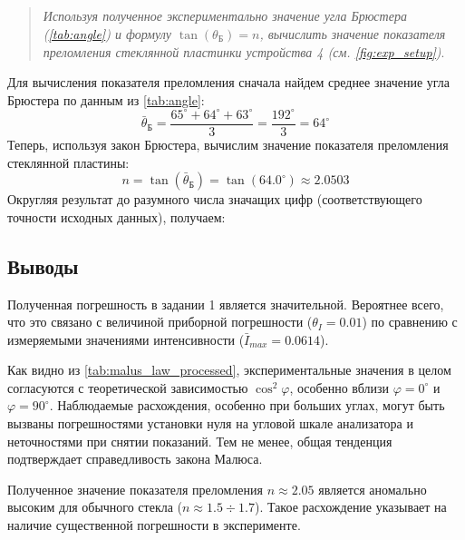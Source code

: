 \subsection*{  }
\begin{quote}
    \textit{Используя полученное экспериментально значение угла Брюстера (\cref{tab:angle}) и формулу $\tan(\theta_\text{Б}) = n$, вычислить значение показателя преломления стеклянной пластинки устройства 4 (см. \cref{fig:exp_setup})}.
\end{quote}

Для вычисления показателя преломления сначала найдем среднее значение угла Брюстера по данным из \cref{tab:angle}:
$$
\bar{\theta}_Б = \frac{65^\circ + 64^\circ + 63^\circ}{3} = \frac{192^\circ}{3} = 64^\circ
$$
Теперь, используя закон Брюстера, вычислим значение показателя преломления стеклянной пластины:
$$
n = \tan(\bar{\theta}_Б) = \tan(64.0^\circ) \approx 2.0503
$$
Округляя результат до разумного числа значащих цифр (соответствующего точности исходных данных), получаем:
\begin{flushright}
\end{flushright}



\subsection*{Выводы}
Полученная погрешность в задании 1 является значительной. Вероятнее всего, что это связано с величиной приборной погрешности ($\theta_I=0.01$) по сравнению с измеряемыми значениями интенсивности ($\bar{I}_{max} = 0.0614$).

Как видно из \cref{tab:malus_law_processed}, экспериментальные значения в целом согласуются с теоретической зависимостью $\cos^2\varphi$, особенно вблизи $\varphi=0^\circ$ и $\varphi=90^\circ$. Наблюдаемые расхождения, особенно при больших углах, могут быть вызваны погрешностями установки нуля на угловой шкале анализатора и неточностями при снятии показаний. Тем не менее, общая тенденция подтверждает справедливость закона Малюса.

Полученное значение показателя преломления $n \approx 2.05$ является аномально высоким для обычного стекла ($n \approx 1.5 \div 1.7$). Такое расхождение указывает на наличие существенной погрешности в эксперименте.




















